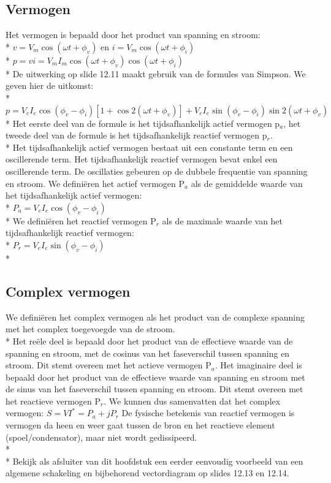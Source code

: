 \documentclass[10pt]{article}
\begin{document}
\subsection{Vermogen}
Het vermogen is bepaald door het product van spanning en stroom:\\*
$v = V_m\cos{(\omega t+\phi_v)}$ en $i = V_m\cos{(\omega t+\phi_i)}$\\*
$p = vi = V_mI_m\cos{(\omega t+\phi_v)}\cos{(\omega t+\phi_i)}$\\*
De uitwerking op slide 12.11 maakt gebruik van de formules van Simpson. We geven hier de uitkomst:\\*
$p = V_eI_e\cos{(\phi_v-\phi_i)}\left[1+\cos{2(\omega t+\phi_v)}\right]+V_eI_e\sin{(\phi_v-\phi_i)}\sin{2(\omega t+\phi_v)}$\\*
Het eerste deel van de formule is het tijdsafhankelijk actief vermogen p$_a$, het tweede deel van de formule is het tijdsafhankelijk reactief vermogen p$_r$.\\*
Het tijdsafhankelijk actief vermogen bestaat uit een constante term en een oscillerende term. Het tijdsafhankelijk reactief vermogen bevat enkel een oscillerende term. De oscillaties gebeuren op de dubbele frequentie van spanning en stroom.
We defini\"eren het actief vermogen P$_a$ als de gemiddelde waarde van het tijdsafhankelijk actief vermogen:\\*
$P_a = V_eI_e\cos{(\phi_v-\phi_i)}$\\*
We defini\"eren het reactief vermogen P$_r$ als de maximale waarde van het tijdsafhankelijk reactief vermogen:\\*
$P_r = V_eI_e\sin{(\phi_v-\phi_i)}$\\*
\subsection{Complex vermogen}
We defini\"eren het complex vermogen als het product van de complexe spanning met het complex toegevoegde van de stroom.\\*
Het re\"ele deel is bepaald door het product van de effectieve waarde van de spanning en stroom, met de cosinus van het faseverschil tussen spanning en stroom. Dit stemt overeen met het actieve vermogen P$_a$. Het imaginaire deel is bepaald door het product van de effectieve waarde van spanning en stroom met de sinus van het faseverschil tussen spanning en stroom. Dit stemt overeen met het reactieve vermogen P$_r$. We kunnen dus samenvatten dat het complex vermogen: $S = VI^* = P_a + jP_r$
De fysische betekenis van reactief vermogen is vermogen da heen en weer gaat tussen de bron en het reactieve element (spoel/condensator), maar niet wordt gedissipeerd.\\*\\*
Bekijk als afsluiter van dit hoofdstuk een eerder eenvoudig voorbeeld van een algemene schakeling en bijbehorend vectordiagram op slides 12.13 en 12.14.
\end{document}

